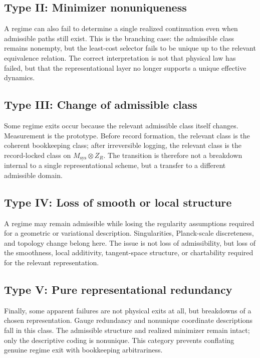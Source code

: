 \documentclass[11pt]{article}
\begin{document}
\subsection{Type II: Minimizer nonuniqueness}
A regime can also fail to determine a single realized continuation even when
admissible paths still exist. This is the branching case: the admissible class
remains nonempty, but the least-cost selector fails to be unique up to the
relevant equivalence relation. The correct interpretation is not that physical
law has failed, but that the representational layer no longer supports a unique
effective dynamics.

\subsection{Type III: Change of admissible class}
Some regime exits occur because the relevant admissible class itself changes.
Measurement is the prototype. Before record formation, the relevant class is the
coherent bookkeeping class; after irreversible logging, the relevant class is the
record-locked class on $M_{\mathrm{sys}} \otimes Z_R$. The transition is
therefore not a breakdown internal to a single representational scheme, but a
transfer to a different admissible domain.

\subsection{Type IV: Loss of smooth or local structure}
A regime may remain admissible while losing the regularity assumptions required
for a geometric or variational description. Singularities, Planck-scale
discreteness, and topology change belong here. The issue is not loss of
admissibility, but loss of the smoothness, local additivity, tangent-space
structure, or chartability required for the relevant representation.

\subsection{Type V: Pure representational redundancy}
Finally, some apparent failures are not physical exits at all, but breakdowns of
a chosen representation. Gauge redundancy and nonunique coordinate descriptions
fall in this class. The admissible structure and realized minimizer remain
intact; only the descriptive coding is nonunique. This category prevents
conflating genuine regime exit with bookkeeping arbitrariness.
\end{document}
